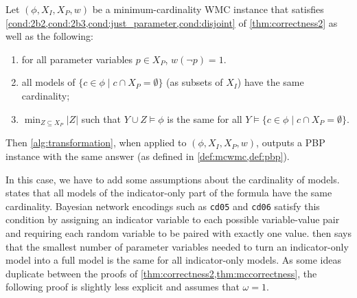 \begin{theorem} \label{thm:mccorrectness}
  Let $(\phi, X_I, X_P, w)$ be a minimum-cardinality WMC instance that satisfies
  \cref{cond:2b2,cond:2b3,cond:just_parameter,cond:disjoint} of
  \cref{thm:correctness2} as well as the following:
  \begin{enumerate}
  \item for all parameter variables $p \in X_P$, $w(\neg p) = 1$.
  \item all models of $\{ c \in \phi \mid c \cap X_P = \emptyset \}$ (as subsets
    of $X_I$) have the same cardinality; \label{cond:22}
  \item $\min_{Z \subseteq X_P} |Z|$ such that $Y \cup Z \models \phi$ is the
    same for all $Y \models \{ c \in \phi \mid c \cap X_P = \emptyset
    \}$. \label{cond:23}
  \end{enumerate}
  Then \cref{alg:transformation}, when applied to $(\phi, X_I, X_P, w)$, outputs
  a PBP instance with the same answer (as defined in \cref{def:mcwmc,def:pbp}).
\end{theorem}

In this case, we have to add some assumptions about the cardinality of models.
 states that all models of the indicator-only part of the formula
have the same cardinality. Bayesian network encodings such as \texttt{cd05} and
\texttt{cd06} satisfy this condition by assigning an indicator variable to each
possible variable-value pair and requiring each random variable to be paired
with exactly one value.  then says that the smallest number of
parameter variables needed to turn an indicator-only model into a full model is
the same for all indicator-only models. As some ideas duplicate between the
proofs of \cref{thm:correctness2,thm:mccorrectness}, the following proof is
slightly less explicit and assumes that $\omega = 1$.

